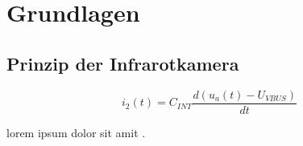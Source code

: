 \clearpage
{}
\section{Grundlagen}
\label{Grundlagen}
\vspace{-2mm}
\subsection{Prinzip der Infrarotkamera}

\begin{equation}
i_{2}(t) = C_{INT}\frac{d(u_{a}(t) - U_{V\!BUS})}{dt}
\label{eq:formulai2}
\end{equation}

lorem \cite{puhani2020statistik} ipsum \cite{budziergerlach1} dolor \cite{DAC121Sdatasheet} sit \cite{curvefitting} amit \cite{tissot2}.